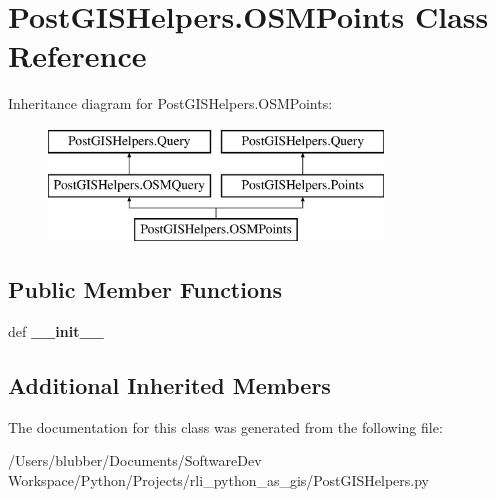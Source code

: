 \hypertarget{class_post_g_i_s_helpers_1_1_o_s_m_points}{}\section{Post\+G\+I\+S\+Helpers.\+O\+S\+M\+Points Class Reference}
\label{class_post_g_i_s_helpers_1_1_o_s_m_points}
Inheritance diagram for Post\+G\+I\+S\+Helpers.\+O\+S\+M\+Points\+:\begin{figure}[H]
\begin{center}
\leavevmode
\includegraphics[height=3.000000cm]{class_post_g_i_s_helpers_1_1_o_s_m_points}
\end{center}
\end{figure}
\subsection*{Public Member Functions}
\begin{DoxyCompactItemize}
\item 
\hypertarget{class_post_g_i_s_helpers_1_1_o_s_m_points_a0a00cdc88ad4057b455e4221a8674c90}{}def {\bfseries \+\_\+\+\_\+init\+\_\+\+\_\+}\label{class_post_g_i_s_helpers_1_1_o_s_m_points_a0a00cdc88ad4057b455e4221a8674c90}

\end{DoxyCompactItemize}
\subsection*{Additional Inherited Members}


The documentation for this class was generated from the following file\+:\begin{DoxyCompactItemize}
\item 
/\+Users/blubber/\+Documents/\+Software\+Dev Workspace/\+Python/\+Projects/rli\+\_\+python\+\_\+as\+\_\+gis/Post\+G\+I\+S\+Helpers.\+py\end{DoxyCompactItemize}
